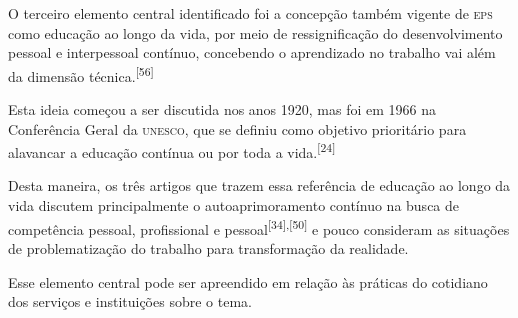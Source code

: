 \documentclass{article}
\begin{document}
O terceiro elemento central identificado foi a concepção também vigente de \textsc{eps}
como educação ao longo da vida, por meio de ressignificação do desenvolvimento
pessoal e interpessoal contínuo, concebendo o aprendizado no trabalho vai além
da dimensão técnica.\textsuperscript{[}\textsuperscript{56}\textsuperscript{]}

Esta ideia começou a ser discutida nos anos 1920, mas foi em 1966 na Conferência
Geral da \textsc{unesco}, que se definiu como objetivo prioritário para alavancar a
educação contínua ou por toda a vida.\textsuperscript{[}\textsuperscript{24}\textsuperscript{]}

Desta maneira, os três artigos que trazem essa referência de educação ao longo
da vida discutem principalmente o autoaprimoramento contínuo na busca de
competência pessoal, profissional e pessoal\textsuperscript{[}\textsuperscript{34}\textsuperscript{]}\textsuperscript{,}\textsuperscript{[}\textsuperscript{50}\textsuperscript{]}
e pouco consideram as situações de problematização do trabalho para
transformação da realidade.

Esse elemento central pode ser apreendido em relação às práticas do cotidiano
dos serviços e instituições sobre o tema.
\end{document}
